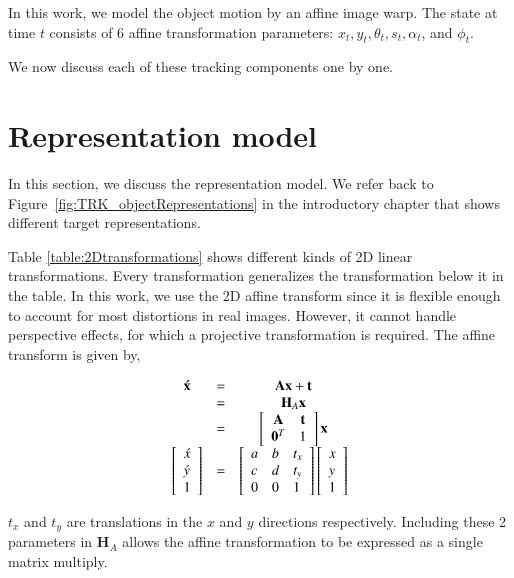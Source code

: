 In this work, we model the object motion by an affine image warp.  The state at time $t$ consists of 6 affine transformation parameters: $x_t,  y_t, \theta_t, s_t, \alpha_t$, and $\phi_t$.


We now discuss each of these tracking components one by one.

\section{Representation model}
\label{Sec:Representation_model}
In this section, we discuss the representation model.  We refer back to Figure~\ref{fig:TRK_objectRepresentations} in the introductory chapter that shows different target representations.  



Table \ref{table:2Dtransformations} shows different kinds of 2D linear transformations.  Every transformation generalizes the transformation below it in the table.  In this work, we use the 2D affine transform since it is flexible enough to account for most distortions in real images.  However, it cannot handle perspective effects, for which a projective transformation is required. The affine transform is given by,

\begin{equation}
\begin{array}{cccc}
\mathbf{\acute{x}} &=& \mathbf{A}\mathbf{x} + \mathbf{t}\\
&=&\mathbf{H}_A \mathbf{x}\\
&=& \left[\begin{array}{cccc}\mathbf{A} & \mathbf{t}\\\mathbf{0}^T & 1\end{array}\right] \mathbf{x}\\
\left[\begin{array}{l}\acute{x}\\\acute{y}\\1\end{array}\right]   &=& \left[ \begin{array}{lll} a &b & t_x \\ c & d & t_y \\ 0 & 0 & 1 \\ \end{array} \right] \left[\begin{array}{l}x\\y\\1\end{array}\right]
\end{array}
\end{equation}

$t_x$ and $t_y$ are translations in the $x$ and $y$ directions respectively.  Including these 2 parameters in $\mathbf{H}_A$ allows the affine transformation to be expressed as a single matrix multiply.  

